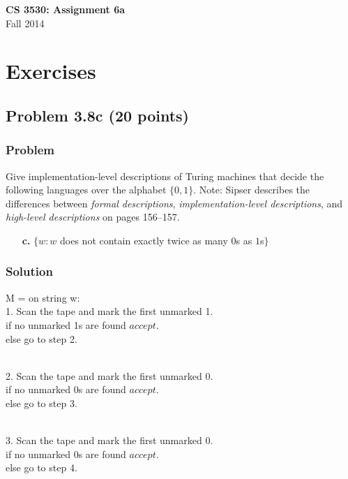 \documentclass{article}
\begin{document}
\begin{center}
\textbf{\Large CS 3530: Assignment 6a} \\[2mm]
Fall 2014
\end{center}

\raggedright

\section*{Exercises}

\subsection*{Problem 3.8c (20 points)}

\subsubsection*{Problem}

Give implementation-level descriptions of Turing machines that
decide the following languages over the alphabet $\{0,1\}$. Note:
Sipser describes the differences between \textit{formal
descriptions}, \textit{implementation-level descriptions}, and
\textit{high-level descriptions} on pages 156--157.

\begin{enumerate}
\item[\bfseries c.] $\{w:w$ does not contain exactly twice as many
$0$s as $1$s$\}$ 
\end{enumerate}

\subsubsection*{Solution}
M = on string w: \\
1. Scan the tape and mark the first unmarked 1. \\ \parindent=12pt
   if no unmarked 1s are found $accept$. \\
   else go to step 2. \\ \ \\ \parindent=0pt

2. Scan the tape and mark the first unmarked 0. \\ \parindent=12pt
   if no unmarked 0s are found $accept$. \\
   else go to step 3. \\ \ \\ \parindent=0pt

3. Scan the tape and mark the first unmarked 0. \\ \parindent=12pt
   if no unmarked 0s are found $accept$. \\
   else go to step 4. \\ \ \\ \parindent=0pt
\end{document}
